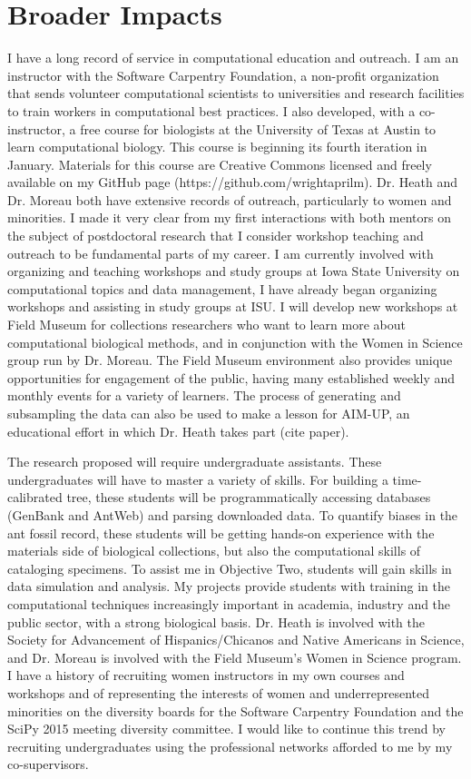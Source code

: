 \documentclass[]{article}
\begin{document}
 \section*{Broader Impacts}
 I have a long record of service in computational education and outreach. I am an instructor with the Software Carpentry Foundation, a non-profit organization that sends volunteer computational scientists to universities and research facilities to train workers in computational best practices. I also developed, with a co-instructor, a free course for biologists at the University of Texas at Austin to learn computational biology.  This course is beginning its fourth iteration in January. Materials for this course are Creative Commons licensed and freely available on my GitHub page (https://github.com/wrightaprilm). Dr. Heath and Dr. Moreau both have extensive records of outreach, particularly to women and minorities. I made it very clear from my first interactions with both mentors on the subject of postdoctoral research that I consider workshop teaching and outreach to be fundamental parts of my career. I am currently involved with organizing and teaching workshops and study groups at Iowa State University on computational topics and data management, I have already began organizing workshops and assisting in study groups at ISU. I will develop new workshops at Field Museum for collections researchers who want to learn more about computational biological methods, and in conjunction with the Women in Science group run by Dr. Moreau. The Field Museum environment also provides unique opportunities for engagement of the public, having many established weekly and monthly events for a variety of learners. The process of generating and subsampling the data can also be used to make a lesson for AIM-UP, an educational effort in which Dr. Heath takes part (cite paper). \par
The research proposed will require undergraduate assistants. These undergraduates will have to master a variety of skills. For building a time-calibrated tree, these students will be programmatically accessing databases (GenBank and AntWeb) and parsing downloaded data. To quantify biases in the ant fossil record, these students will be getting hands-on experience with the materials side of biological collections, but also the computational skills of cataloging specimens. To assist me in Objective Two, students will gain skills in data simulation and analysis. My projects provide students with training in the computational techniques increasingly important in academia, industry and the public sector, with a strong biological basis. Dr. Heath is involved with the Society for Advancement of Hispanics/Chicanos and Native Americans in Science, and Dr. Moreau is involved with the Field Museum's Women in Science program. I have a history of recruiting women instructors in my own courses and workshops and of representing the interests of women and underrepresented minorities on the diversity boards for the Software Carpentry Foundation and the SciPy 2015 meeting diversity committee. I would like to continue this trend by recruiting undergraduates using the professional networks afforded to me by my co-supervisors.\par
\end{document}
